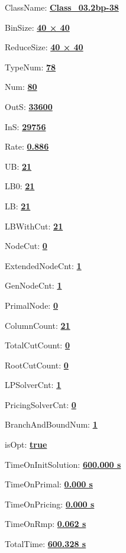\documentclass[11pt]{article}
\begin{document}
\pagestyle{empty}


ClassName: \underline{\textbf{Class_03.2bp-38}}
\par
BinSize: \underline{\textbf{40 × 40}}
\par
ReduceSize: \underline{\textbf{40 × 40}}
\par
TypeNum: \underline{\textbf{78}}
\par
Num: \underline{\textbf{80}}
\par
OutS: \underline{\textbf{33600}}
\par
InS: \underline{\textbf{29756}}
\par
Rate: \underline{\textbf{0.886}}
\par
UB: \underline{\textbf{21}}
\par
LB0: \underline{\textbf{21}}
\par
LB: \underline{\textbf{21}}
\par
LBWithCut: \underline{\textbf{21}}
\par
NodeCut: \underline{\textbf{0}}
\par
ExtendedNodeCnt: \underline{\textbf{1}}
\par
GenNodeCnt: \underline{\textbf{1}}
\par
PrimalNode: \underline{\textbf{0}}
\par
ColumnCount: \underline{\textbf{21}}
\par
TotalCutCount: \underline{\textbf{0}}
\par
RootCutCount: \underline{\textbf{0}}
\par
LPSolverCnt: \underline{\textbf{1}}
\par
PricingSolverCnt: \underline{\textbf{0}}
\par
BranchAndBoundNum: \underline{\textbf{1}}
\par
isOpt: \underline{\textbf{true}}
\par
TimeOnInitSolution: \underline{\textbf{600.000 s}}
\par
TimeOnPrimal: \underline{\textbf{0.000 s}}
\par
TimeOnPricing: \underline{\textbf{0.000 s}}
\par
TimeOnRmp: \underline{\textbf{0.062 s}}
\par
TotalTime: \underline{\textbf{600.328 s}}
\par
\newpage


\end{document}
